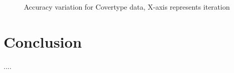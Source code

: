 \documentclass{article} %
\begin{document}
\begin{figure}
\caption{Accuracy variation for Covertype data, X-axis represents iteration}
\label{fig:acc_cov}
\end{figure}
\section{Conclusion}

....
\end{document}
